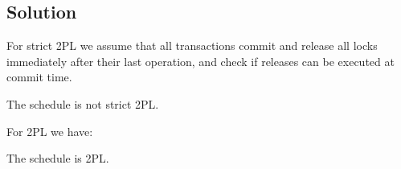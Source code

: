 \documentclass[12pt, a4paper]{report}
\newtheorem[style=M,bodystyle=\normalfont]{theorem}{Theorem}
\newtheorem[style=M,bodystyle=\normalfont]{corollary}{Corollary}
\newtheorem[style=M,bodystyle=\normalfont]{lemma}{Lemma}
\newtheorem[style=M,bodystyle=\normalfont]{definition}{Definition}
\begin{document}
    \subsection*{Solution}
        For strict 2PL we assume that all transactions commit and release all locks immediately after their last operation, and check if releases can be executed at commit time.
        \begin{table}[H]
            \centering
        \end{table}
        The schedule is not strict 2PL.

        For 2PL we have:
        \begin{table}[H]
            \centering
        \end{table}
        The schedule is 2PL. 
\end{document}
